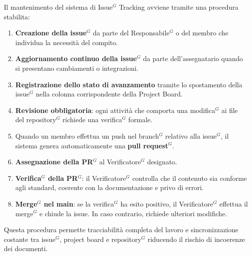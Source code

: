 Il mantenimento del sistema di Issue$^G$ Tracking avviene tramite una procedura stabilita:
\begin{enumerate}[itemsep=3pt, parsep=1pt, leftmargin=*]
    \item \textbf{Creazione della issue$^G$} da parte del Responsabile$^G$ o del membro che individua la necessità del compito.
    \item \textbf{Aggiornamento continuo della issue$^G$} da parte dell’assegnatario quando si presentano cambiamenti o integrazioni.
    \item \textbf{Registrazione dello stato di avanzamento} tramite lo spostamento della issue$^G$ nella colonna corrispondente della Project Board.
    \item \textbf{Revisione obbligatoria}: ogni attività che comporta una modifica$^G$ ai file del repository$^G$ richiede una verifica$^G$ formale.
    \item Quando un membro effettua un push nel branch$^G$ relativo alla issue$^G$, il sistema genera automaticamente una \textbf{pull request$^G$}.
    \item \textbf{Assegnazione della PR$^G$} al Verificatore$^G$ designato.
    \item \textbf{Verifica$^G$ della PR$^G$}: il Verificatore$^G$ controlla che il contenuto sia conforme agli standard, coerente con la documentazione e privo di errori.
    \item \textbf{Merge$^G$ nel main}: se la verifica$^G$ ha esito positivo, il Verificatore$^G$ effettua il merge$^G$ e chiude la issue. In caso contrario, richiede ulteriori modifiche.
\end{enumerate}
Questa procedura permette tracciabilità completa del lavoro e sincronizzazione costante tra issue$^G$, project board e repository$^G$ riducendo il rischio di incoerenze dei documenti.

